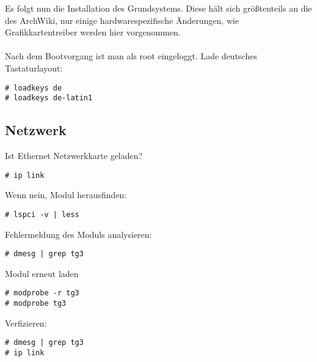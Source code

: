 Es folgt nun die Installation des Grundsystems. Diese hält sich größtenteils an die des ArchWiki, nur einige hardwarespezifische Änderungen, wie Grafikkartentreiber werden hier vorgenommen.\\
\\
Nach dem Bootvorgang ist man als root eingeloggt.
Lade deutsches Tastaturlayout:
\begin{lstlisting}[style=Bash]
# loadkeys de
# loadkeys de-latin1
\end{lstlisting}

\subsection{Netzwerk}
\label{subsec:network}
Ist Ethernet Netzwerkkarte geladen?
\begin{lstlisting}[style=Bash]
# ip link 
\end{lstlisting}
Wenn nein, Modul herausfinden:
\begin{lstlisting}[style=Bash]
# lspci -v | less 
\end{lstlisting}
Fehlermeldung des Moduls analysieren:
\begin{lstlisting}[style=Bash]
# dmesg | grep tg3 
\end{lstlisting}
Modul erneut laden
\begin{lstlisting}[style=Bash]
# modprobe -r tg3
# modprobe tg3
\end{lstlisting}
Verfizieren:
\begin{lstlisting}[style=Bash]
# dmesg | grep tg3 
# ip link
\end{lstlisting}

